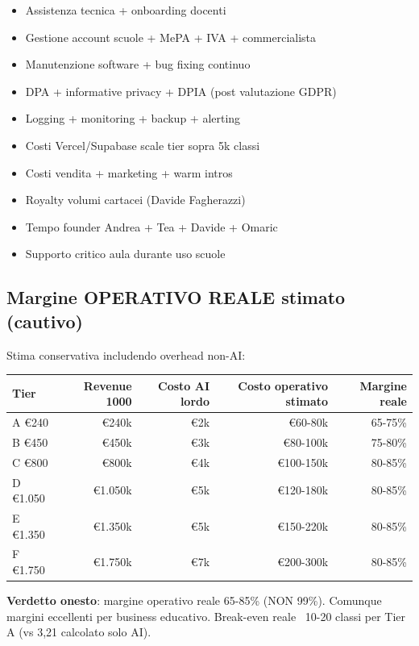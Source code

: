 \documentclass[12pt,a4paper]{article}
\begin{document}
\begin{itemize}[leftmargin=*]
  \item Assistenza tecnica + onboarding docenti
  \item Gestione account scuole + MePA + IVA + commercialista
  \item Manutenzione software + bug fixing continuo
  \item DPA + informative privacy + DPIA (post valutazione GDPR)
  \item Logging + monitoring + backup + alerting
  \item Costi Vercel/Supabase scale tier sopra 5k classi
  \item Costi vendita + marketing + warm intros
  \item Royalty volumi cartacei (Davide Fagherazzi)
  \item Tempo founder Andrea + Tea + Davide + Omaric
  \item Supporto critico aula durante uso scuole
\end{itemize}

\subsection*{Margine OPERATIVO REALE stimato (cautivo)}

Stima conservativa includendo overhead non-AI:

\begin{center}
\begin{tabular}{lrrrr}
\toprule
\textbf{Tier} & \textbf{Revenue 1000} & \textbf{Costo AI lordo} & \textbf{Costo operativo stimato} & \textbf{Margine reale} \\
\midrule
A €240   & €240k   & €2k & €60-80k  & ~65-75\% \\
B €450   & €450k   & €3k & €80-100k & ~75-80\% \\
C €800   & €800k   & €4k & €100-150k & ~80-85\% \\
D €1.050 & €1.050k & €5k & €120-180k & ~80-85\% \\
E €1.350 & €1.350k & €5k & €150-220k & ~80-85\% \\
F €1.750 & €1.750k & €7k & €200-300k & ~80-85\% \\
\bottomrule
\end{tabular}
\end{center}

\textbf{Verdetto onesto}: margine operativo reale 65-85\% (NON 99\%). Comunque margini eccellenti per business educativo. Break-even reale ~10-20 classi per Tier A (vs 3,21 calcolato solo AI).
\end{document}
